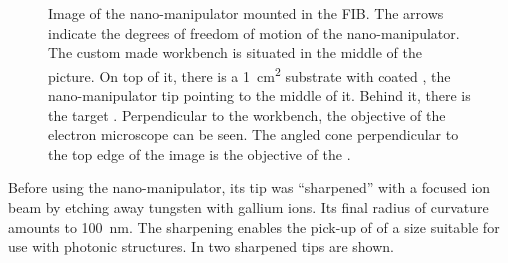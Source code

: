 		\begin{figure}[htp]
				\centering
				\caption[Nano-manipulator in a SEM setup]{Image of the nano-manipulator mounted in the FIB. The arrows indicate the degrees of freedom of motion of the nano-manipulator. The custom made workbench is situated in the middle of the picture. On top of it, there is a \SI{1}{\centi\meter\squared} substrate with coated \nds, the nano-manipulator tip pointing to the middle of it. Behind it, there is the target \vcsel. Perpendicular to the workbench, the objective of the electron microscope can be seen. The angled cone perpendicular to the top edge of the image is the objective of the \fib.}
				\label{fig::nanomanipulator_image}
		\end{figure}

		Before using the nano-manipulator, its tip was ``sharpened'' with a focused ion beam by etching away tungsten with gallium ions. Its final radius of curvature amounts to \SI{100}{\nano\meter}. The sharpening enables the pick-up of \nds of a size suitable for use with photonic structures.
		In  two sharpened tips are shown.

